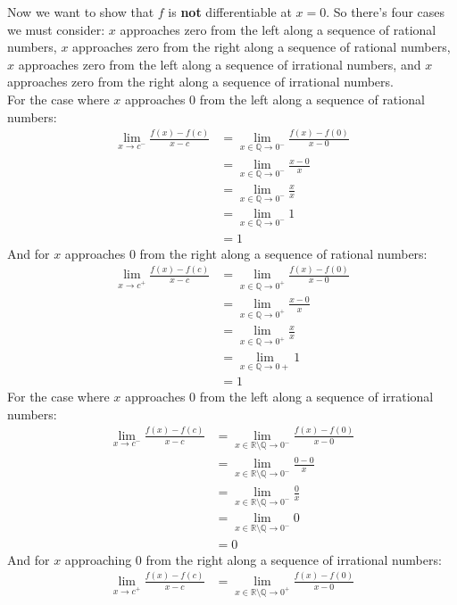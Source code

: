 \documentclass[12pt,letterpaper]{article}
\newcommand{\R}{\mathbb{R}}
\newcommand{\Q}{\mathbb{Q}}
\theoremstyle{case}
\theoremstyle{definition}
\begin{document}
\begin{enumerate}
\begin{enumerate}
			Now we want to show that $f$ is \textbf{not} differentiable at $x=0$. So there's four cases we must consider: $x$ approaches zero from the left along a sequence of rational numbers, $x$ approaches zero from the right along a sequence of rational numbers, $x$ approaches zero from the left along a sequence of irrational numbers, and $x$ approaches zero from the right along a sequence of irrational numbers.\\
			
			For the case where $x$ approaches 0 from the left along a sequence of rational numbers:
			\begin{align*}
				\lim\limits_{x \to c^-} \frac{f(x)-f(c)}{x-c} &= \lim\limits_{x \in \Q \to 0^-} \frac{f(x)-f(0)}{x-0} \\
				&=\lim\limits_{x \in \Q \to 0^-} \frac{x-0}{x} \\
				&= \lim\limits_{x \in \Q \to 0^-} \frac{x}{x} \\
				&= \lim\limits_{x \in \Q \to 0^-} 1 \\
				&= 1
			\end{align*}
			And for $x$ approaches 0 from the right along a sequence of rational numbers:
			\begin{align*}
				\lim\limits_{x \to c^+} \frac{f(x)-f(c)}{x-c} &= \lim\limits_{x \in \Q \to 0^+} \frac{f(x)-f(0)}{x-0} \\
				&= \lim\limits_{x \in \Q \to 0^+} \frac{x-0}{x} \\
				&= \lim\limits_{x \in \Q \to 0^+} \frac{x}{x} \\
				&= \lim\limits_{x \in \Q \to 0+} 1 \\
				&= 1
			\end{align*}
			For the case where $x$ approaches 0 from the left along a sequence of irrational numbers:
			\begin{align*}
				\lim\limits_{x \to c^-} \frac{f(x)-f(c)}{x-c} &= \lim\limits_{x \in \R \setminus \Q \to 0^-} \frac{f(x)-f(0)}{x-0} \\
				&= \lim\limits_{x \in \R \setminus \Q \to 0^-} \frac{0-0}{x} \\
				&= \lim\limits_{x \in \R \setminus \Q \to 0^-} \frac{0}{x} \\
				&= \lim\limits_{x \in \R \setminus \Q \to 0^-} 0 \\
				&= 0
			\end{align*}
			And for $x$ approaching 0 from the right along a sequence of irrational numbers:
			\begin{align*}
				\lim\limits_{x \to c^+} \frac{f(x)-f(c)}{x-c} &= \lim\limits_{x \in \R \setminus \Q \to 0^+} \frac{f(x)-f(0)}{x-0} \\

\end{align*}
\end{enumerate}
\end{enumerate}
\end{document}
